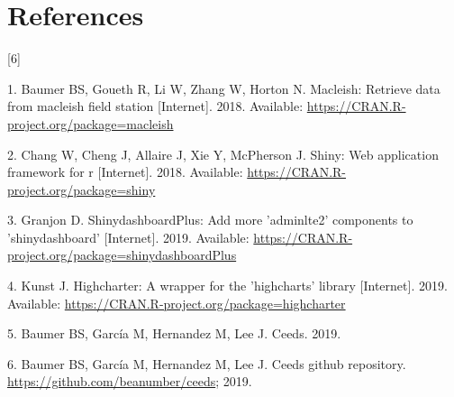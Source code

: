 \documentclass[10pt,letterpaper]{article}
\begin{document}
\section*{References}\label{references}

{[}6{]}

\hypertarget{refs}{}
\hypertarget{ref-macleish}{}
1. Baumer BS, Goueth R, Li W, Zhang W, Horton N. Macleish: Retrieve data
from macleish field station {[}Internet{]}. 2018. Available:
\url{https://CRAN.R-project.org/package=macleish}

\hypertarget{ref-shiny}{}
2. Chang W, Cheng J, Allaire J, Xie Y, McPherson J. Shiny: Web
application framework for r {[}Internet{]}. 2018. Available:
\url{https://CRAN.R-project.org/package=shiny}

\hypertarget{ref-dashboardplus}{}
3. Granjon D. ShinydashboardPlus: Add more 'adminlte2' components to
'shinydashboard' {[}Internet{]}. 2019. Available:
\url{https://CRAN.R-project.org/package=shinydashboardPlus}

\hypertarget{ref-highcharter}{}
4. Kunst J. Highcharter: A wrapper for the 'highcharts' library
{[}Internet{]}. 2019. Available:
\url{https://CRAN.R-project.org/package=highcharter}

\hypertarget{ref-ceeds}{}
5. Baumer BS, García M, Hernandez M, Lee J. Ceeds. 2019.

\hypertarget{ref-ceeds_repo}{}
6. Baumer BS, García M, Hernandez M, Lee J. Ceeds github repository.
\url{https://github.com/beanumber/ceeds}; 2019.

\nolinenumbers
\end{document}
